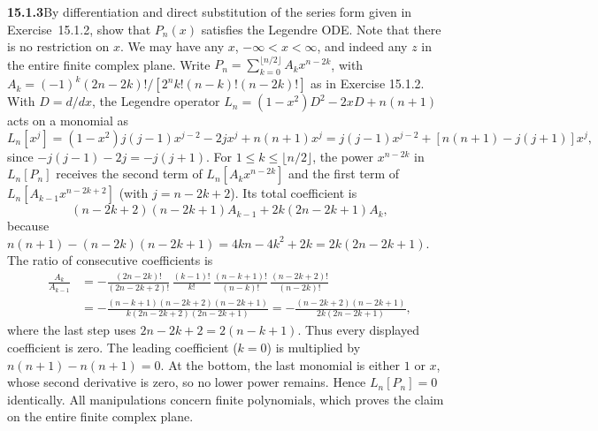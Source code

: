 \par\bigskip
\noindent\textbf{15.1.3}\quad By differentiation and direct
substitution of the series form given in Exercise~15.1.2, show that
$P_{n}(x)$ satisfies the Legendre ODE. Note that there is no
restriction on $x$. We may have any $x$, $-\infty<x<\infty$, and
indeed any $z$ in the entire finite complex plane.
\solution
Write $P_n=\sum_{k=0}^{\lfloor n/2\rfloor}A_kx^{n-2k}$, with
$A_k=(-1)^k(2n-2k)!/[2^nk!(n-k)!(n-2k)!]$
as in Exercise 15.1.2. With $D=d/dx$, the Legendre operator
$L_n=(1-x^2)D^2-2xD+n(n+1)$ acts on a monomial as
\[
L_n[x^j]=(1-x^2)j(j-1)x^{j-2}-2jx^j+n(n+1)x^j
=j(j-1)x^{j-2}+[n(n+1)-j(j+1)]x^j,
\]
since $-j(j-1)-2j=-j(j+1)$.
For $1\le k\le\lfloor n/2\rfloor$, the power $x^{n-2k}$ in $L_n[P_n]$
receives the second term of $L_n[A_kx^{n-2k}]$ and the first term of
$L_n[A_{k-1}x^{n-2k+2}]$ (with $j=n-2k+2$). Its total coefficient is
\[
(n-2k+2)(n-2k+1)A_{k-1}
+2k(2n-2k+1)A_k,
\]
because
$n(n+1)-(n-2k)(n-2k+1)=4kn-4k^2+2k=2k(2n-2k+1)$.
The ratio of consecutive coefficients is
\begin{align*}
\frac{A_k}{A_{k-1}}
&=-\frac{(2n-2k)!}{(2n-2k+2)!}\,\frac{(k-1)!}{k!}\,
\frac{(n-k+1)!}{(n-k)!}\,\frac{(n-2k+2)!}{(n-2k)!}\\
&=-\frac{(n-k+1)(n-2k+2)(n-2k+1)}{k(2n-2k+2)(2n-2k+1)}
=-\frac{(n-2k+2)(n-2k+1)}{2k(2n-2k+1)},
\end{align*}
where the last step uses $2n-2k+2=2(n-k+1)$.
Thus every displayed coefficient is zero. The leading coefficient
($k=0$) is multiplied by $n(n+1)-n(n+1)=0$.
At the bottom, the last monomial is either $1$ or $x$, whose second
derivative is zero, so no lower power remains. Hence $L_n[P_n]=0$
identically. All manipulations concern finite polynomials, which proves
the claim on the entire finite complex plane.

